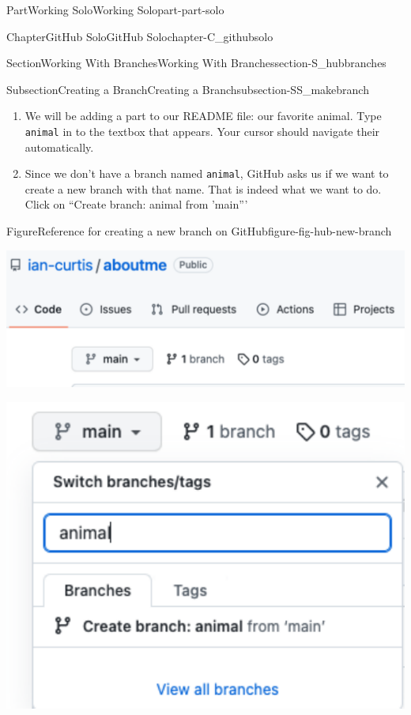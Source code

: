\documentclass[oneside,10pt,]{book}
\newcommand{\mono}[1]{\texttt{#1}}
\begin{document}
\begin{partptx}{Part}{Working Solo}{}{Working Solo}{}{}{part-part-solo}
\begin{chapterptx}{Chapter}{GitHub Solo}{}{GitHub Solo}{}{}{chapter-C_githubsolo}
\begin{sectionptx}{Section}{Working With Branches}{}{Working With Branches}{}{}{section-S_hubbranches}
\begin{subsectionptx}{Subsection}{Creating a Branch}{}{Creating a Branch}{}{}{subsection-SS_makebranch}
\begin{enumerate}
\item{}We will be adding a part to our README file: our favorite animal. Type \mono{animal} in to the textbox that appears. Your cursor should navigate their automatically.%
\item{}Since we don't have a branch named \mono{animal}, GitHub asks us if we want to create a new branch with that name. That is indeed what we want to do. Click on ``Create branch: animal from 'main'''%
\end{enumerate}
%
\begin{figureptx}{Figure}{Reference for creating a new branch on GitHub}{figure-fig-hub-new-branch}{}%
\begin{sidebyside}{2}{0}{0}{0}%
\begin{sbspanel}{0.5}%
\includegraphics[width=\linewidth]{external/hub_new_branch.pdf}
\end{sbspanel}%
\begin{sbspanel}{0.5}%
\includegraphics[width=\linewidth]{external/hub_new_branch_animal.pdf}
\end{sbspanel}%
\end{sidebyside}%
\tcblower
\end{figureptx}%

\end{subsectionptx}
\end{sectionptx}
\end{chapterptx}
\end{partptx}
\end{document}
